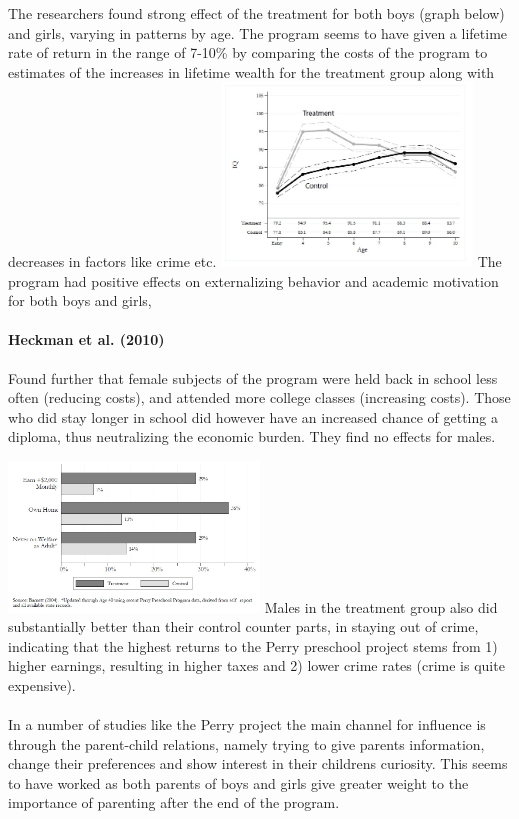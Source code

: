 \documentclass[12pt, a4paper]{article}
\begin{document}
\begin{multicols}{2}
The researchers found strong effect of the treatment for both boys (graph below) and girls, varying in patterns by age. The program seems to have given a lifetime rate of return in the range of 7-10\% by comparing the costs of the program to estimates of the increases in lifetime wealth for the treatment group along with decreases in factors like crime etc. 
\includegraphics[width = 0.5\textwidth]{iq.jpg}
The program had positive effects on externalizing behavior and academic motivation for both boys and girls, 


\paragraph{Heckman et al. (2010)} Found further that female subjects of the program were held back in school less often (reducing costs), and attended more college classes (increasing costs). Those who did stay longer in school did however have an increased chance of getting a diploma, thus neutralizing the economic burden. They find no effects for males. 

\includegraphics[width = 0.5\textwidth]{perry2.jpg}
Males in the treatment group also did substantially better than their control counter parts, in staying out of crime, indicating that the highest returns to the Perry preschool project stems from 1) higher earnings, resulting in higher taxes and 2) lower crime rates (crime is quite expensive).
\\ \\
In a number of studies like the Perry project the main channel for influence is through the parent-child relations, namely trying to give parents information, change their preferences and show interest in their childrens curiosity. This seems to have worked as both parents of boys and girls give greater weight to the importance of parenting after the end of the program.


\end{multicols}
\end{document}
